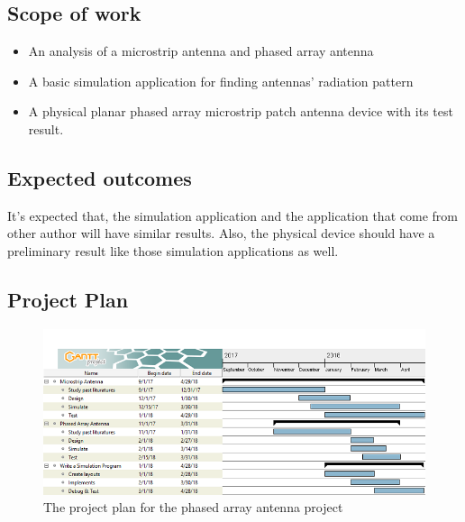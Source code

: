 \documentclass[11pt,a4paper]{article}
\begin{document}
    \subsection{Scope of work}
      \begin{itemize}
        \item An analysis of a microstrip antenna and phased array antenna
        \item A basic simulation application for finding antennas' radiation pattern
        \item A physical planar phased array microstrip patch antenna device with its test result.
      \end{itemize}

    \subsection{Expected outcomes}
      \indent It's expected that, the simulation application and the application that come from other author
      will have similar results. Also, the physical device should have a preliminary result like those simulation
      applications as well.
  
  \newpage
    \begin{landscape}  
    \subsection{Project Plan}
      \begin{figure}[ht]
        \includegraphics{gantt.png}
        \centering
        \caption{The project plan for the phased array antenna project}
      \end{figure}
    \end{landscape}
  
  \newpage

   
  
\end{document}
